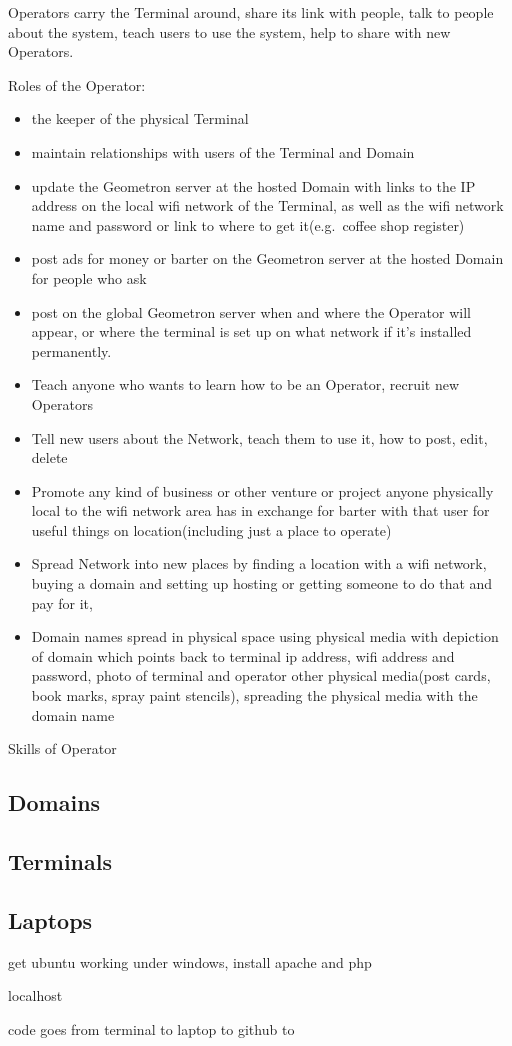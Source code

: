 Operators carry the Terminal around, share its link with people, talk to
people about the system, teach users to use the system, help to share
with new Operators.

Roles of the Operator:

\begin{itemize}
\tightlist
\item
  the keeper of the physical Terminal
\item
  maintain relationships with users of the Terminal and Domain
\item
  update the Geometron server at the hosted Domain with links to the IP
  address on the local wifi network of the Terminal, as well as the wifi
  network name and password or link to where to get it(e.g.~coffee shop
  register)
\item
  post ads for money or barter on the Geometron server at the hosted
  Domain for people who ask
\item
  post on the global Geometron server when and where the Operator will
  appear, or where the terminal is set up on what network if it's
  installed permanently.
\item
  Teach anyone who wants to learn how to be an Operator, recruit new
  Operators
\item
  Tell new users about the Network, teach them to use it, how to post,
  edit, delete
\item
  Promote any kind of business or other venture or project anyone
  physically local to the wifi network area has in exchange for barter
  with that user for useful things on location(including just a place to
  operate)
\item
  Spread Network into new places by finding a location with a wifi
  network, buying a domain and setting up hosting or getting someone to
  do that and pay for it,
\item
  Domain names spread in physical space using physical media with
  depiction of domain which points back to terminal ip address, wifi
  address and password, photo of terminal and operator other physical
  media(post cards, book marks, spray paint stencils), spreading the
  physical media with the domain name
\end{itemize}

Skills of Operator

\subsection{Domains}\label{domains}

\subsection{Terminals}\label{terminals}

\subsection{Laptops}\label{laptops}

get ubuntu working under windows, install apache and php

localhost

code goes from terminal to laptop to github to
